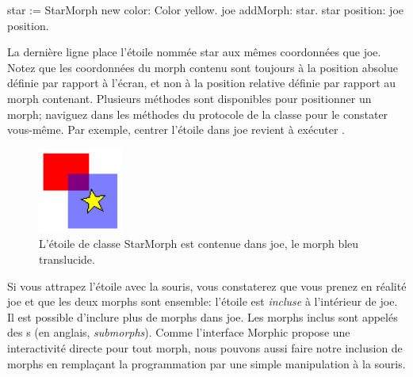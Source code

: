 \documentclass[a4paper,10pt,twoside]{book}
\begin{document}
\begin{code}{}
star := StarMorph new color: Color yellow.
joe addMorph: star.
star position: joe position.
\end{code}

\noindent
La dernière ligne place l'étoile nommée star aux mêmes
coordonnées que joe. Notez que les coordonnées du morph
contenu sont toujours à la position absolue définie par rapport
à l'écran, et non à la position relative définie par rapport
au morph contenant.
Plusieurs méthodes sont disponibles pour positionner un morph;
naviguez dans les méthodes du protocole  de la
classe  pour le constater vous-même.
Par exemple, centrer l'étoile dans joe revient à exécuter
  .

\begin{figure}[ht]
	\centerline{\includegraphics{joeStar}}
	\caption{L'étoile de classe StarMorph est contenue dans joe, le
      morph bleu translucide.\label{fig:joeStar}}
\end{figure}

Si vous attrapez l'étoile avec la souris, vous constaterez que vous
prenez en réalité joe et que les deux morphs sont ensemble:
l'étoile est \emph{incluse} %
à l'intérieur de joe.
Il est possible d'inclure plus de morphs dans joe. %
Les morphs inclus sont appelés des s (en anglais,
\emph{submorphs}). %
Comme l'interface Morphic propose une interactivité directe pour
tout morph, nous pouvons aussi faire notre inclusion de morphs en
remplaçant la programmation par une simple manipulation à la souris.
\end{document}
